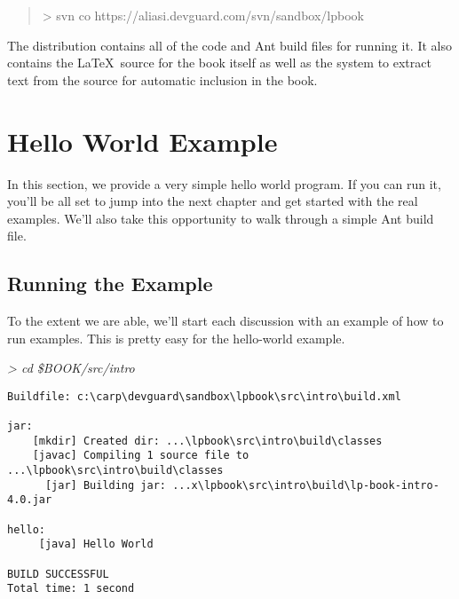 \begin{quote}
{\small\ttfamily
> svn co https://aliasi.devguard.com/svn/sandbox/lpbook
}
\end{quote}
%
The distribution contains all of the code and Ant build files for
running it.  It also contains the \LaTeX\ source for the book itself
as well as the system to extract text from the source for automatic
inclusion in the book.


\section{Hello World Example}

In this section, we provide a very simple hello world program.  If you
can run it, you'll be all set to jump into the next chapter and get
started with the real examples.  We'll also take this opportunity to
walk through a simple Ant build file.

\subsection{Running the Example}

To the extent we are able, we'll start each discussion with an example
of how to run examples.  This is pretty easy for the hello-world example.

\noindent
{\it\ttfamily > cd \$BOOK/src/intro}
{\small\begin{verbatim}
Buildfile: c:\carp\devguard\sandbox\lpbook\src\intro\build.xml

jar:
    [mkdir] Created dir: ...\lpbook\src\intro\build\classes
    [javac] Compiling 1 source file to ...\lpbook\src\intro\build\classes
      [jar] Building jar: ...x\lpbook\src\intro\build\lp-book-intro-4.0.jar

hello:
     [java] Hello World

BUILD SUCCESSFUL
Total time: 1 second
\end{verbatim}}













